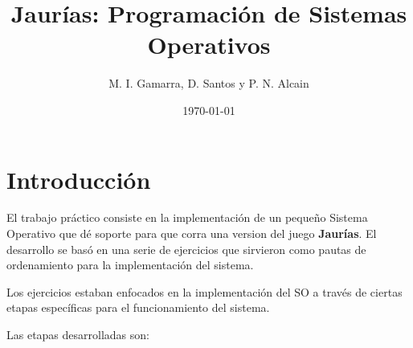\documentclass[twocolumn,10pt]{article}
\begin{document}
 

\title{Jaurías: Programación de Sistemas Operativos}

\author{M. I. Gamarra, D. Santos y P. N. Alcain}


\date{\today}


\maketitle

\section{Introducción}
El trabajo práctico consiste en la implementación de un pequeño
Sistema Operativo que dé soporte para que corra una version del juego
\textbf{Jaurías}. El desarrollo se basó en una serie de ejercicios que
sirvieron como pautas de ordenamiento para la implementación del
sistema.

Los ejercicios estaban enfocados en la implementación del SO a través
de ciertas etapas específicas para el funcionamiento del sistema.

Las etapas desarrolladas son:
\end{document}
